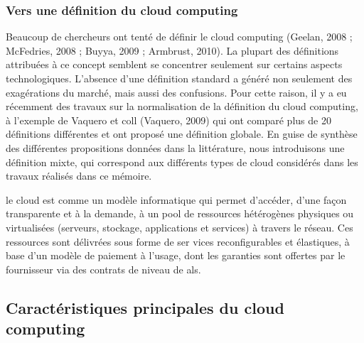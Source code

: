 \subsubsection{Vers une définition du cloud computing }
Beaucoup de chercheurs ont tenté de définir le cloud computing (Geelan, 2008 ; McFedries, 2008 ; Buyya, 2009 ; Armbrust, 2010). La plupart des définitions attribuées à ce concept semblent se concentrer seulement sur certains aspects technologiques. L'absence d'une définition standard a généré non seulement des exagérations du marché, mais aussi des confusions. Pour cette raison, il y a eu récemment des travaux sur la normalisation de la définition du cloud computing, à l'exemple de Vaquero et coll (Vaquero, 2009) qui ont comparé plus de 20 définitions différentes et ont proposé une définition globale.  En guise de synthèse des différentes propositions données dans la littérature, nous introduisons une définition mixte, qui correspond aux différents types de cloud considérés dans les travaux réalisés dans ce mémoire.

\begin{defn}
  le cloud est comme un modèle informatique qui permet d’accéder, d’une façon transparente et à la demande, à un pool de ressources hétérogènes physiques ou virtualisées (serveurs, stockage, applications et services) à travers le réseau. Ces ressources sont délivrées sous forme de ser vices reconfigurables et élastiques, à base d’un modèle de paiement à l’usage, dont les garanties sont offertes par le fournisseur via des contrats de niveau de  \ac{als}. 
\end{defn}
%
%    
%
    \subsection{Caractéristiques principales du cloud computing}
% 
